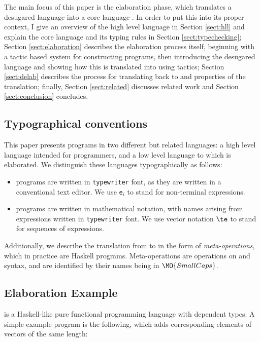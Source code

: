 \noindent
The main focus of this paper is the elaboration phase, which translates
a desugared language \IdrisM{} into a core language \TT{}. In order to put
this into its proper context, I give an overview of the high level language
\Idris{} in Section \ref{sect:hll} and explain the core language \TT{} and
its typing rules in Section \ref{sect:typechecking}; 
Section \ref{sect:elaboration} describes the elaboration process itself,
beginning with a tactic based system for constructing
\TT{} programs, then introducing the desugared language \IdrisM{} and
showing how this is translated into \TT{} using tactics;
Section
\ref{sect:delab} describes the process for translating \TT{} back to \Idris{}
and properties of the translation; finally, 
Section \ref{sect:related} discusses related work and Section \ref{sect:conclusion}
concludes.

\subsection{Typographical conventions}

This paper presents programs in two different but related languages: a high level
language \Idris{} intended for programmers, and a low level language \TT{} to
which \Idris{} is elaborated. We distinguish these languages typographically as
follows:

\begin{itemize}
\item \Idris{} programs are written in \texttt{typewriter} font, as they are written
in a conventional text editor. We use \texttt{e$_i$} to stand for non-terminal
expressions.
\item \TT{} programs are written in mathematical notation, with names arising
from \Idris{} expressions written in \texttt{typewriter} font. We use vector notation
$\te$ to stand for sequences of expressions.
\end{itemize}

Additionally, we describe the translation from \Idris{} to \TT{} in the form
of \emph{meta-operations}, which in practice are Haskell programs. Meta-operations
are operations on \Idris{} and \TT{} syntax, and are identified by their names being
in $\MO{SmallCaps}$.

\subsection{Elaboration Example}

\Idris{} is a Haskell-like pure functional programming language with dependent
types.  A simple example program is the following, which adds corresponding
elements of vectors of the same length:

